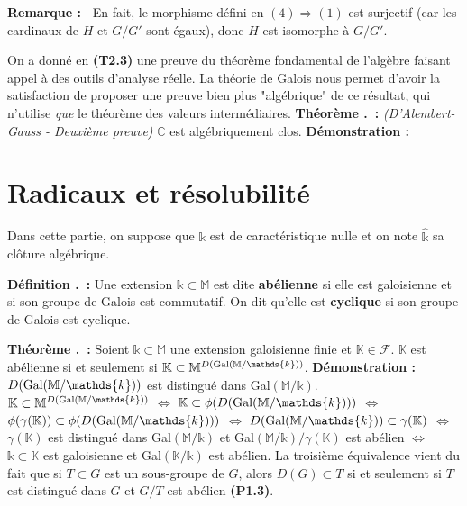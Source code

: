 \documentclass[5pt,a4paper]{article}
\newcounter{prop}[section]
\newcounter{defin}[section]
\newcounter{thm}[section]
\renewcommand{\thedefin}{\thesection.\arabic{defin}}
\renewcommand{\thethm}{\thesection.\arabic{thm}}
\newcommand{\defin}[1]{\stepcounter{defin}\noindent\textbf{Définition \thedefin ~:} #1 \newline}
\newcommand{\thm}[1]{\stepcounter{thm}\noindent\textbf{Théorème \thethm ~:} #1 \newline}
\newcommand{\demo}[1]{\textbf{Démonstration :~} #1 \newline}
\newcommand{\rmq}[1]{\textbf{Remarque :~} #1 \newline}
\begin{document}
\begin{onehalfspacing}
\rmq{En fait, le morphisme défini en $(4) \Rightarrow (1)$ est surjectif (car les cardinaux de $H$ et $G/G'$ sont égaux), donc $H$ est isomorphe à $G/G'$.}


On a donné en \textbf{(T2.3)} une preuve du théorème fondamental de l'algèbre faisant appel à des outils d'analyse réelle. La théorie de Galois nous permet d'avoir la satisfaction de proposer une preuve bien plus "algébrique" de ce résultat, qui n'utilise \textit{que} le théorème des valeurs intermédiaires.
\newline
\thm{\textit{(D'Alembert-Gauss - Deuxième preuve)} $\mathbb{C}$ est algébriquement clos.}
\demo{}

\newpage
\section{Radicaux et résolubilité}
Dans cette partie, on suppose que $\mathds{k}$ est de caractéristique nulle et on note $\hat{\mathds{k}}$ sa clôture algébrique.\newline


\defin{Une extension $\mathds{k} \subset \mathbb{M}$ est dite \textbf{abélienne} si elle est galoisienne et si son groupe de Galois est commutatif. On dit qu'elle est \textbf{cyclique} si son groupe de Galois est cyclique.}


\thm{Soient $\mathds{k} \subset \mathbb{M}$ une extension galoisienne finie et $\mathbb{K} \in \mathcal{F}$. $\mathbb{K}$ est abélienne si et seulement si $\mathbb{K} \subset \mathbb{M}^{D(\textup{Gal}(\mathbb{M}/\mathds{k}))}$.}
\demo{$D(\textup{Gal}(\mathbb{M}/\mathds{k}))$ est distingué dans Gal$(\mathbb{M}/\mathds{k})$. $\mathbb{K} \subset \mathbb{M}^{D(\textup{Gal}(\mathbb{M}/\mathds{k}))}$ $\Leftrightarrow$ $\mathbb{K} \subset \phi(D(\textup{Gal}(\mathbb{M}/\mathds{k})))$ $\Leftrightarrow$ $\phi(\gamma(\mathbb{K})) \subset \phi(D(\textup{Gal}(\mathbb{M}/\mathds{k})))$ $\Leftrightarrow$ $D(\textup{Gal}(\mathbb{M}/\mathds{k})) \subset \gamma(\mathbb{K})$ $\Leftrightarrow$ $\gamma(\mathbb{K})$ est distingué dans Gal$(\mathbb{M}/\mathds{k})$ et Gal$(\mathbb{M}/\mathds{k})/\gamma(\mathbb{K})$ est abélien $\Leftrightarrow$ $\mathds{k} \subset \mathbb{K}$ est galoisienne et Gal$(\mathbb{K}/\mathds{k})$ est abélien. La troisième équivalence vient du fait que si $T \subset G$ est un sous-groupe de $G$, alors $D(G) \subset T$ si et seulement si $T$ est distingué dans $G$ et $G/T$ est abélien \textbf{(P1.3)}.}



\end{onehalfspacing}
\end{document}
